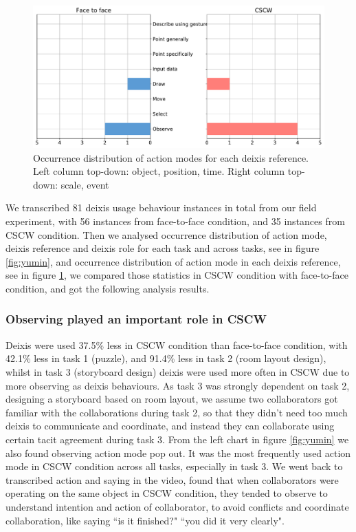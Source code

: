 \documentclass[12pt,twoside]{article}
\begin{document}
\begin{figure}
  \includegraphics[width=\linewidth]{img/Event.pdf}
  \vspace{3.7cm}
\endminipage\hfill
\caption{Occurrence distribution of action modes for each deixis reference. Left column top-down: object, position, time. Right column top-down: scale, event}\label{fig:jiayao}
\end{figure}

We transcribed 81 deixis usage behaviour instances in total from our field experiment, with 56 instances from face-to-face condition, and 35 instances from CSCW condition. Then we analysed occurrence distribution of action mode, deixis reference and deixis role for each task and across tasks, see in figure \ref{fig:yumin}, and occurrence distribution of action mode in each deixis reference, see in figure \ref{fig:jiayao}, we compared those statistics in CSCW condition with face-to-face condition, and got the following analysis results.

\subsubsection{Observing played an important role in CSCW}
Deixis were used 37.5\% less in CSCW condition than face-to-face condition, with 42.1\% less in task 1 (puzzle), and 91.4\% less in task 2 (room layout design), whilst in task 3 (storyboard design) deixis were used more often in CSCW due to more observing as deixis behaviours. As task 3 was strongly dependent on task 2, designing a storyboard based on room layout, we assume two collaborators got familiar with the collaborations during task 2, so that they didn't need too much deixis to communicate and coordinate, and instead they can collaborate using certain tacit agreement during task 3. From the left chart in figure \ref{fig:yumin} we also found observing action mode pop out. It was the most frequently used action mode in CSCW condition across all tasks, especially in task 3. We went back to transcribed action and saying in the video, found that when collaborators were operating on the same object in CSCW condition, they tended to observe to understand intention and action of collaborator, to avoid conflicts and coordinate collaboration, like saying ``is it finished?" ``you did it very clearly".
\end{document}
